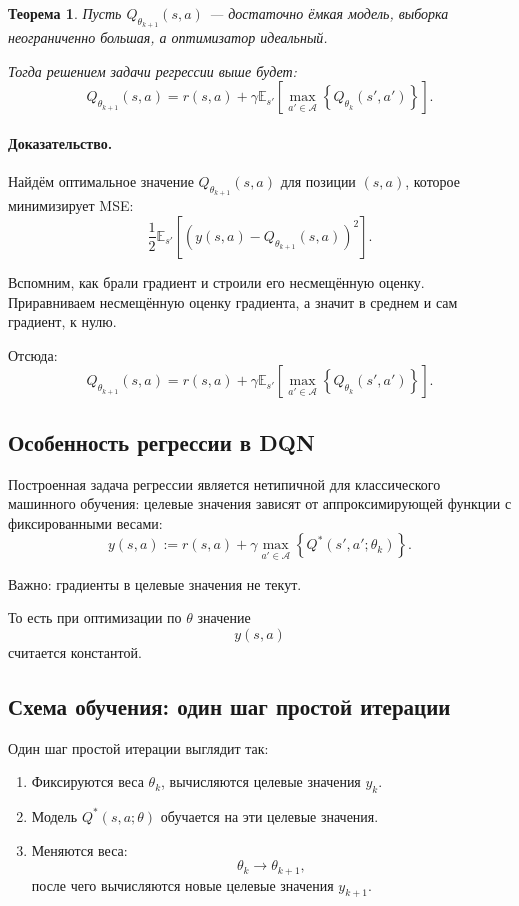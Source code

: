 \documentclass[12pt,a4paper]{article}
\newtheorem{theorem}{Теорема}
\begin{document}
\begin{theorem}
Пусть $Q_{\theta_{k+1}}(s,a)$ --- достаточно ёмкая модель, выборка неограниченно большая, а оптимизатор идеальный.

Тогда решением задачи регрессии выше будет:
\[
Q_{\theta_{k+1}}(s,a)
=
r(s,a)
+
\gamma
\mathbb E_{s'}
\left[
\max_{a' \in \mathcal A}
\left\{
Q_{\theta_k}(s',a')
\right\}
\right].
\]
\end{theorem}

\paragraph{Доказательство.}

Найдём оптимальное значение $Q_{\theta_{k+1}}(s,a)$ для позиции $(s,a)$, которое минимизирует MSE:
\[
\frac{1}{2}
\mathbb E_{s'}
\left[
\left(
y(s,a)
-
Q_{\theta_{k+1}}(s,a)
\right)^2
\right].
\]

Вспомним, как брали градиент и строили его несмещённую оценку. Приравниваем несмещённую оценку градиента, а значит в среднем и сам градиент, к нулю.

Отсюда:
\[
Q_{\theta_{k+1}}(s,a)
=
r(s,a)
+
\gamma
\mathbb E_{s'}
\left[
\max_{a' \in \mathcal A}
\left\{
Q_{\theta_k}(s',a')
\right\}
\right].
\]

\subsection{Особенность регрессии в DQN}

Построенная задача регрессии является нетипичной для классического машинного обучения: целевые значения зависят от аппроксимирующей функции с фиксированными весами:
\[
y(s,a)
:=
r(s,a)
+
\gamma
\max_{a' \in \mathcal A}
\left\{
Q^\ast(s',a';\theta_k)
\right\}.
\]

Важно: градиенты в целевые значения не текут.

То есть при оптимизации по $\theta$ значение
\[
y(s,a)
\]
считается константой.

\subsection{Схема обучения: один шаг простой итерации}

Один шаг простой итерации выглядит так:

\begin{enumerate}
    \item Фиксируются веса $\theta_k$, вычисляются целевые значения $y_k$.
    \item Модель $Q^\ast(s,a;\theta)$ обучается на эти целевые значения.
    \item Меняются веса:
    \[
    \theta_k \to \theta_{k+1},
    \]
    после чего вычисляются новые целевые значения $y_{k+1}$.
\end{enumerate}
\end{document}
